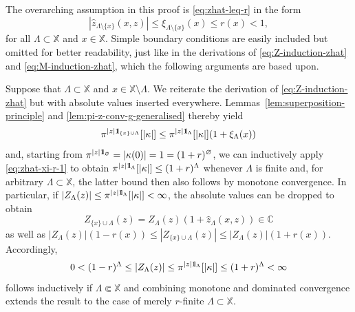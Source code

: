 \documentclass[reqno, 11pt]{amsart}
\theoremstyle{definition}
\newcommand{\C}{\mathbb{C}}
\newcommand{\X}{\mathbb X}
\newcommand{\be}{\begin{equation}}
\newcommand{\ee}{\end{equation}}
\def\1{{\mathchoice {1\mskip-4mu\mathrm l}      
{1\mskip-4mu\mathrm l}
{1\mskip-4.5mu\mathrm l} {1\mskip-5mu\mathrm l}}}
\begin{document}
The overarching assumption in this proof is \eqref{eq:zhat-leq-r} in the form
\be \label{eq:zhat-xi-r-1}
	|\widehat z_{\Lambda \setminus \{x\}}(x, z)| \leq \xi_{\Lambda \setminus \{x\}}(x) \leq r(x) < 1,
\ee
for all $\Lambda \subset \X$ and $x \in \X$. 
Simple boundary conditions are easily included but omitted for better readability, just like in the derivations of \eqref{eq:Z-induction-zhat} and \eqref{eq:M-induction-zhat}, which the following arguments are based upon.

Suppose that $\Lambda \subset \X$ and $x \in \X \setminus \Lambda$. 
We reiterate the derivation of \eqref{eq:Z-induction-zhat} but with absolute values inserted everywhere.  Lemmas~\ref{lem:superposition-principle} and \ref{lem:pi-z-conv-g-generalised} thereby yield
\[
	\pi^{|z| \1_{\{x\} \cup \Lambda}}[|\kappa|] \leq \pi^{|z| \1_\Lambda}[|\kappa|] (1 + \xi_\Lambda(x))
\]
and, starting from $\pi^{|z| \1_\varnothing} = |\kappa(0)| = 1 = (1 + r)^\varnothing$, we can inductively apply \eqref{eq:zhat-xi-r-1} to obtain $\pi^{|z| \1_\Lambda}[|\kappa|] \leq (1 + r)^\Lambda$ whenever $\Lambda$ is finite and, for arbitrary $\Lambda \subset \X$, the latter bound then also follows by monotone convergence. 
In particular, if $|Z_\Lambda(z)| \leq \pi^{|z| \1_\Lambda}[|\kappa|] < \infty$, the absolute values can be dropped to obtain
\[
	Z_{\{x\} \cup \Lambda}(z) = Z_\Lambda(z) (1 + \widehat z_\Lambda(x, z)) \in \C
\]
as well as $|Z_\Lambda(z)| (1 - r(x)) \leq |Z_{\{x\} \cup \Lambda}(z)| \leq |Z_\Lambda(z)| (1 + r(x))$. 
Accordingly,
\[
	0 < (1 - r)^\Lambda \leq |Z_\Lambda(z)| \leq \pi^{|z| \1_\Lambda}[|\kappa|] \leq (1 + r)^\Lambda < \infty
\]
follows inductively if $\Lambda \Subset \X$ and combining monotone and dominated convergence extends the result to the case of merely $r$-finite $\Lambda \subset \X$.
\end{document}

